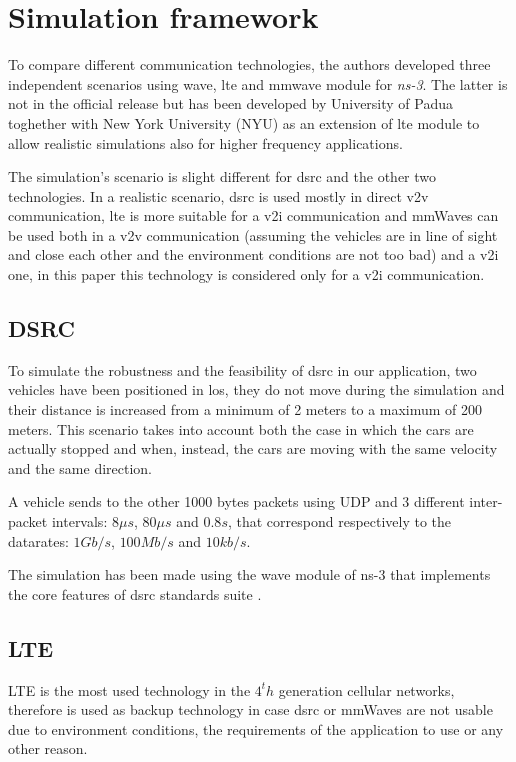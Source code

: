 
\section{Simulation framework}
\label{sec:simulation_framework}
To compare different communication technologies, the authors developed three independent scenarios using wave, lte and mmwave module for \textit{ns-3}. The latter is not in the official release but has been developed by University of Padua toghether with New York University (NYU) as an extension of lte module to allow realistic simulations also for higher frequency applications. 

The simulation's scenario is slight different for \gls{dsrc} and the other two technologies. In a realistic scenario, \gls{dsrc} is used mostly in direct \gls{v2v} communication, lte is more suitable for a \gls{v2i} communication and \gls{mmWaves} can be used both in a \gls{v2v} communication (assuming the vehicles are in line of sight and close each other and the environment conditions are not too bad) and a \gls{v2i} one, in this paper this technology is considered only for a \gls{v2i} communication.

\subsection{DSRC}
To simulate the robustness and the feasibility of \gls{dsrc} in our application, two vehicles have been positioned in \gls{los}, they do not move during the simulation and their distance is increased from a minimum of 2 meters to a maximum of 200 meters. This scenario takes into account both the case in which the cars are actually stopped and when, instead, the cars are moving with the same velocity and the same direction.

A vehicle sends to the other 1000 bytes packets using UDP and 3 different inter-packet intervals: $8\mu s$, $80\mu s$ and $0.8s$, that correspond respectively to the datarates: $1Gb/s$, $100Mb/s$ and $10kb/s$.

The simulation has been made using the \gls{wave} module of ns-3 that implements the core features of \gls{dsrc} standards suite \cite{WAVEStandard}.

\subsection{LTE}
LTE is the most used technology in the $4^th$ generation cellular networks, therefore is used as backup technology in case \gls{dsrc} or \gls{mmWaves} are not usable due to environment conditions, the requirements of the application to use or any other reason.

